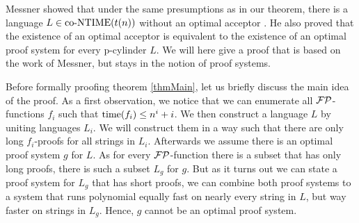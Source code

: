   Messner showed that under the same presumptions as in our theorem, there is a language \(L \in \text{co-NTIME}(t(n))\) without an optimal acceptor \cite{Mes99}. He also proved that the existence of an optimal acceptor is equivalent to the existence of an optimal proof system for every p-cylinder \(L\). We will here give a proof that is based on the work of Messner, but stays in the notion of proof systems.

  Before formally proofing theorem \ref{thmMain}, let us briefly discuss the main idea of the proof. As a first observation, we notice that we can enumerate all \(\mathcal{FP}\)-functions \(f_i\) such that \(\operatorname{time}(f_i) \leq n^i + i\). We then construct a language \(L\) by uniting languages \(L_i\). We will construct them in a way such that there are only long \(f_i\)-proofs for all strings in \(L_i\). Afterwards we assume there is an optimal proof system \(g\) for \(L\). As for every \(\mathcal{FP}\)-function there is a subset that has only long proofs, there is such a subset \(L_g\) for \(g\). But as it turns out we can state a proof system for \(L_g\) that has short proofs, we can combine both proof systems to a system that runs polynomial equally fast on nearly every string in \(L\), but way faster on strings in \(L_g\). Hence, \(g\) cannot be an optimal proof system.
  
